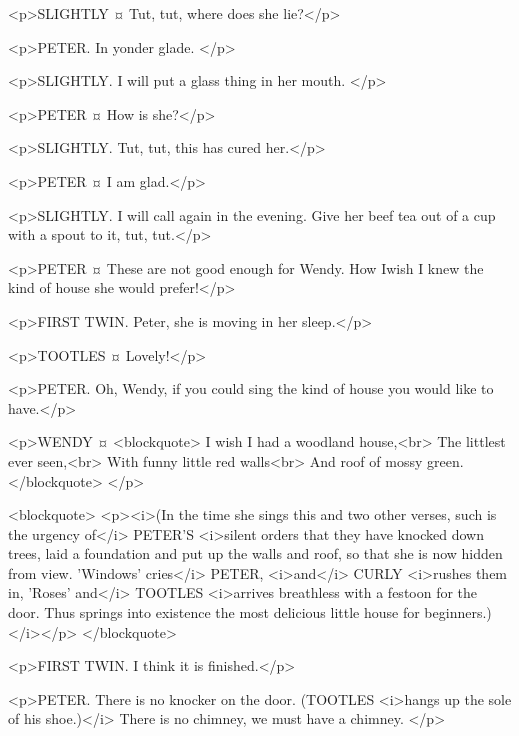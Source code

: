 <p>SLIGHTLY ¤
Tut, tut, where does she lie?</p>

<p>PETER. In yonder glade.
</p>

<p>SLIGHTLY. I will put a glass thing in her mouth.
</p>

<p>PETER ¤
How is she?</p>

<p>SLIGHTLY. Tut, tut, this has cured her.</p>

<p>PETER ¤
I am glad.</p>

<p>SLIGHTLY. I will call again in the evening. Give her beef tea out of a cup with a spout to it, tut, tut.</p>


<p>PETER ¤
These are not good enough for Wendy. How Iwish I knew the kind of house she would prefer!</p>

<p>FIRST TWIN. Peter, she is moving in her sleep.</p>

<p>TOOTLES ¤
Lovely!</p>

<p>PETER. Oh, Wendy, if you could sing the kind of house you would like to have.</p>


<p>WENDY ¤
<blockquote> I wish I had a woodland house,<br> The littlest ever seen,<br> With funny little red walls<br> And roof of mossy green.</blockquote>
</p>

<blockquote> <p><i>(In the time she sings this and two other verses, such is the urgency of</i> PETER'S <i>silent orders that they have knocked down trees, laid a foundation and put up the walls and roof, so that she is now hidden from view. 'Windows' cries</i> PETER, <i>and</i> CURLY <i>rushes them in, 'Roses' and</i> TOOTLES <i>arrives breathless with a festoon for the door. Thus springs into existence the most delicious little house for beginners.)</i></p> </blockquote>

<p>FIRST TWIN. I think it is finished.</p>

<p>PETER. There is no knocker on the door. (TOOTLES <i>hangs up the sole of his shoe.)</i> There is no chimney, we must have a chimney.
</p>

